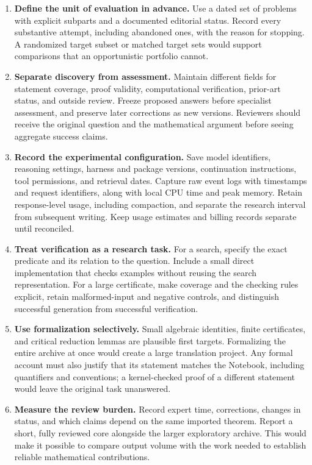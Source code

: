 \begin{enumerate}
\item \textbf{Define the unit of evaluation in advance.}
Use a dated set of problems with explicit subparts and a documented
editorial status. Record every substantive attempt, including abandoned
ones, with the reason for stopping. A randomized target subset or
matched target sets would support comparisons that an opportunistic
portfolio cannot.

\item \textbf{Separate discovery from assessment.}
Maintain different fields for statement coverage, proof validity,
computational verification, prior-art status, and outside review.
Freeze proposed answers before specialist assessment, and preserve
later corrections as new versions. Reviewers should receive the
original question and the mathematical argument before seeing aggregate
success claims.

\item \textbf{Record the experimental configuration.}
Save model identifiers, reasoning settings, harness and package
versions, continuation instructions, tool permissions, and retrieval
dates. Capture raw event logs with timestamps and request identifiers,
along with local CPU time and peak memory. Retain response-level usage, including compaction, and separate the
research interval from subsequent writing. Keep usage estimates and
billing records separate until reconciled.

\item \textbf{Treat verification as a research task.}
For a search, specify the exact predicate and its relation to the
question. Include a small direct implementation that checks examples
without reusing the search representation. For a large certificate,
make coverage and the checking rules explicit, retain malformed-input
and negative controls, and distinguish successful generation from
successful verification.

\item \textbf{Use formalization selectively.}
Small algebraic identities, finite certificates, and critical reduction
lemmas are plausible first targets. Formalizing the entire archive at
once would create a large translation project. Any formal account must
also justify that its statement matches the Notebook, including
quantifiers and conventions; a kernel-checked proof of a different
statement would leave the original task unanswered.

\item \textbf{Measure the review burden.}
Record expert time, corrections, changes in status, and which claims
depend on the same imported theorem. Report a short, fully reviewed
core alongside the larger exploratory archive. This would make it
possible to compare output volume with the work needed to establish
reliable mathematical contributions.
\end{enumerate}

